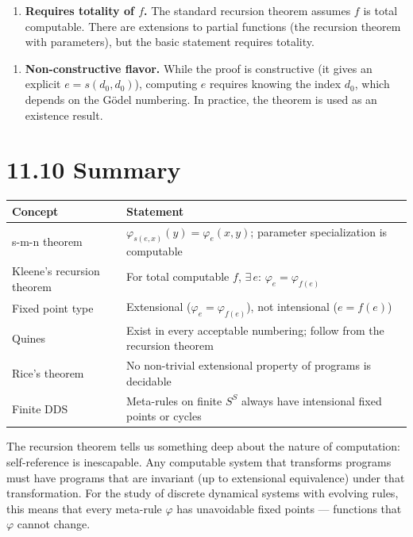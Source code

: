 \begin{enumerate}
  \item \textbf{Requires totality of $f$.} The standard recursion theorem assumes $f$ is total computable. There are extensions to partial functions (the recursion theorem with parameters), but the basic statement requires totality.
\end{enumerate}

\begin{enumerate}
  \item \textbf{Non-constructive flavor.} While the proof is constructive (it gives an explicit $e = s(d_0, d_0)$), computing $e$ requires knowing the index $d_0$, which depends on the Gödel numbering. In practice, the theorem is used as an existence result.
\end{enumerate}

\section{11.10 Summary}

\begin{tabular}{|l|l|}
\hline
Concept & Statement \\
\hline
s-m-n theorem & $\varphi_{s(e,x)}(y) = \varphi_e(x,y)$; parameter specialization is computable \\
Kleene's recursion theorem & For total computable $f$, $\exists\, e$: $\varphi_e = \varphi_{f(e)}$ \\
Fixed point type & Extensional ($\varphi_e = \varphi_{f(e)}$), not intensional ($e = f(e)$) \\
Quines & Exist in every acceptable numbering; follow from the recursion theorem \\
Rice's theorem & No non-trivial extensional property of programs is decidable \\
Finite DDS & Meta-rules on finite $S^S$ always have intensional fixed points or cycles \\
\hline
\end{tabular}


The recursion theorem tells us something deep about the nature of computation: self-reference is inescapable. Any computable system that transforms programs must have programs that are invariant (up to extensional equivalence) under that transformation. For the study of discrete dynamical systems with evolving rules, this means that every meta-rule $\varphi$ has unavoidable fixed points --- functions that $\varphi$ cannot change.

